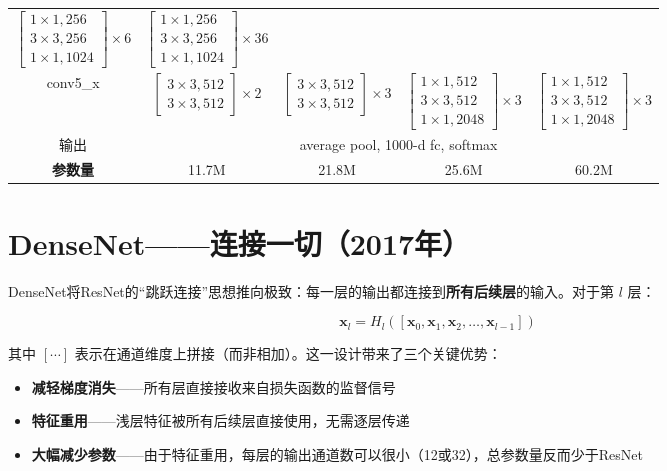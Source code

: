 \begin{center}
\begin{tabular}{c|cccc}
$\begin{bmatrix}1\times1,256\\3\times3,256\\1\times1,1024\end{bmatrix}\times 6$ &
$\begin{bmatrix}1\times1,256\\3\times3,256\\1\times1,1024\end{bmatrix}\times 36$ \\[8pt]
conv5\_x & $\begin{bmatrix}3\times3,512\\3\times3,512\end{bmatrix}\times 2$ &
$\begin{bmatrix}3\times3,512\\3\times3,512\end{bmatrix}\times 3$ &
$\begin{bmatrix}1\times1,512\\3\times3,512\\1\times1,2048\end{bmatrix}\times 3$ &
$\begin{bmatrix}1\times1,512\\3\times3,512\\1\times1,2048\end{bmatrix}\times 3$ \\[8pt]
\midrule
输出 & \multicolumn{4}{c}{average pool, 1000-d fc, softmax} \\
\midrule
\textbf{参数量} & 11.7M & 21.8M & 25.6M & 60.2M \\
\bottomrule
\end{tabular}
\end{center}

\section{DenseNet——连接一切（2017年）}

DenseNet将ResNet的``跳跃连接''思想推向极致：每一层的输出都连接到\textbf{所有后续层}的输入。对于第 $l$ 层：

\[
\mathbf{x}_l = H_l([\mathbf{x}_0, \mathbf{x}_1, \mathbf{x}_2, \dots, \mathbf{x}_{l-1}])
\]

其中 $[\cdots]$ 表示在通道维度上拼接（而非相加）。这一设计带来了三个关键优势：
\begin{itemize}
    \item \textbf{减轻梯度消失}——所有层直接接收来自损失函数的监督信号
    \item \textbf{特征重用}——浅层特征被所有后续层直接使用，无需逐层传递
    \item \textbf{大幅减少参数}——由于特征重用，每层的输出通道数可以很小（12或32），总参数量反而少于ResNet
\end{itemize}

